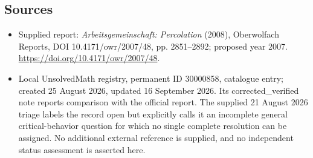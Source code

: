 \documentclass[11pt]{article}
\begin{document}
\subsection{Sources}
\begin{itemize}
\item Supplied report: \emph{Arbeitsgemeinschaft: Percolation} (2008), Oberwolfach Reports, DOI 10.4171/owr/2007/48, pp. 2851--2892; proposed year 2007. \url{https://doi.org/10.4171/owr/2007/48}.
\item Local UnsolvedMath registry, permanent ID 30000858, catalogue entry; created 25 August 2026, updated 16 September 2026. Its corrected\_verified note reports comparison with the official report. The supplied 21 August 2026 triage labels the record open but explicitly calls it an incomplete general critical-behavior question for which no single complete resolution can be assigned. No additional external reference is supplied, and no independent status assessment is asserted here.
\end{itemize}
\end{document}

